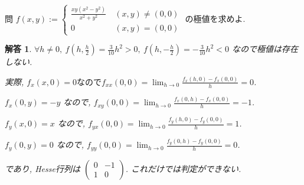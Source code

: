 \documentclass{jsarticle}
\newtheorem*{answer*}{解答}
\begin{document}
\begin{itembox}[l]{問}
$f(x,y) := \begin{cases}
  \displaystyle \frac{xy(x^2-y^2)}{x^2 + y^2} & \ (x,y) \neq (0,0) \\
  0 & \ (x,y) = (0,0)
\end{cases}$ の極値を求めよ.
\end{itembox}

\begin{answer*}
$\forall h \neq 0, \ f\left(h,\displaystyle \frac{h}{2} \right) = \displaystyle \frac{3}{10}h^2 > 0, \ f\left(h,-\frac{h}{2} \right) = -\displaystyle \frac{3}{10}h^2 < 0$ なので極値は存在しない.

実際, $f_x (x,0) = 0 なので f_{xx} (0,0) = \displaystyle \lim_{h \to 0} \frac{f_x (h,0) - f_x (0,0)}{h} = 0$.

$f_x (0,y) = -y$ なので, $f_{xy} (0,0) = \displaystyle \lim_{h \to 0} \frac{f_x (0,h) - f_x (0,0)}{h} = -1$.

$f_y (x,0) = x$ なので, $f_{yx} (0,0) = \displaystyle \lim_{h \to 0} \frac{f_y (h,0) - f_y (0,0)}{h} = 1$.

$f_y (0,y) = 0$ なので, $f_{yy} (0,0) = \displaystyle \lim_{h \to 0} \frac{f_y (0,h) - f_y (0,0)}{h} = 0$.

であり, Hesse行列は $\begin{pmatrix} 0 & -1 \\ 1 & 0 \end{pmatrix}$. これだけでは判定ができない.
\end{answer*}
\end{document}
